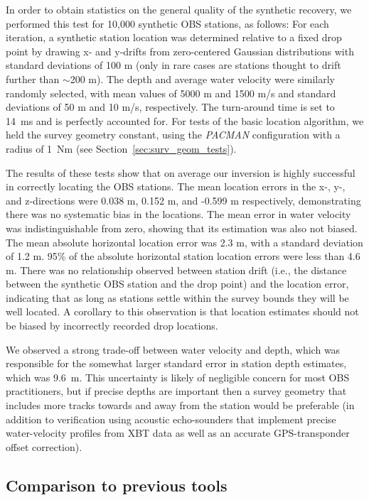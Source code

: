 In order to obtain statistics on the general quality of the synthetic recovery, we performed this test for 10,000 synthetic OBS stations, as follows: For each iteration, a synthetic station location was determined relative to a fixed drop point by drawing x- and y-drifts from zero-centered Gaussian distributions with standard deviations of 100 m (only in rare cases are stations thought to drift further than $\sim$200 m). The depth and average water velocity were similarly randomly selected, with mean values of 5000 m and 1500 m/s and standard deviations of 50 m and 10 m/s, respectively. The turn-around time is set to 14~ms and is perfectly accounted for. For tests of the basic location algorithm, we held the survey geometry constant, using the \textit{PACMAN} configuration with a radius of 1~Nm (see Section~\ref{sec:surv_geom_tests}). 
  
The results of these tests show that on average our inversion is highly successful in correctly locating the OBS stations. The mean location errors in the x-, y-, and z-directions were 0.038 m, 0.152 m, and -0.599 m respectively, demonstrating there was no systematic bias in the locations. The mean error in water velocity was indistinguishable from zero, showing that its estimation was also not biased. The mean absolute horizontal location error was 2.3 m, with a standard deviation of 1.2 m. 95\% of the absolute horizontal station location errors were less than 4.6 m. There was no relationship observed between station drift (i.e., the distance between the synthetic OBS station and the drop point) and the location error, indicating that as long as stations settle within the survey bounds they will be well located. A corollary to this observation is that location estimates should not be biased by incorrectly recorded drop locations. 

We observed a strong trade-off between water velocity and depth, which was responsible for the somewhat larger standard error in station depth estimates, which was \mbox{9.6~m}. This uncertainty is likely of negligible concern for most OBS practitioners, but if precise depths are important then a survey geometry that includes more tracks towards and away from the station would be preferable (in addition to verification using acoustic echo-sounders that implement precise water-velocity profiles from XBT data as well as an accurate GPS-transponder offset correction).

\subsection{Comparison to previous tools} \label{sec:Comparison_to_previous_tools}

